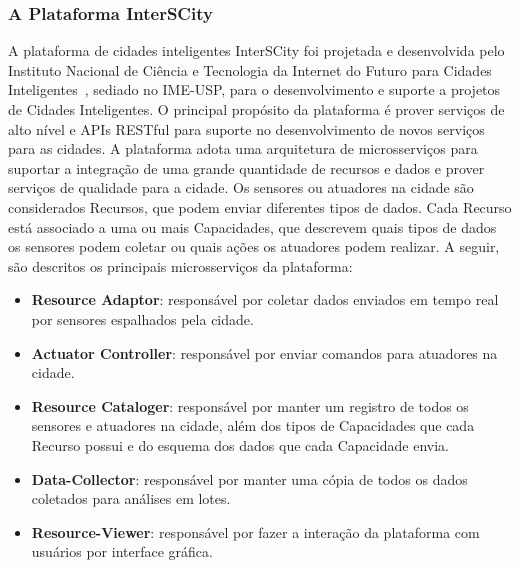 
\subsubsection{A Plataforma InterSCity}
A plataforma de cidades inteligentes InterSCity foi projetada e desenvolvida pelo Instituto Nacional de Ciência e Tecnologia da Internet do Futuro para Cidades Inteligentes~\citep{del2019design}, sediado no IME-USP, para o desenvolvimento e suporte a projetos de Cidades Inteligentes. O principal propósito da plataforma é prover serviços de alto nível e APIs RESTful para suporte no desenvolvimento de novos serviços para as cidades. A plataforma adota uma arquitetura de microsserviços para suportar a integração de uma grande quantidade de recursos e dados e prover serviços de qualidade para a cidade. Os sensores ou atuadores na cidade são considerados Recursos, que podem enviar diferentes tipos de dados. Cada Recurso está associado a uma ou mais Capacidades, que descrevem quais tipos de dados os sensores podem coletar ou quais ações os atuadores podem realizar. A seguir, são descritos os principais microsserviços da plataforma:


\begin{itemize}
\item \textbf{Resource Adaptor}: responsável por coletar dados enviados em tempo real por sensores espalhados pela cidade.
\item \textbf{Actuator Controller}: responsável por enviar comandos para atuadores na cidade.
\item \textbf{Resource Cataloger}: responsável por manter um registro de todos os sensores e atuadores na cidade, além dos tipos de Capacidades que cada Recurso possui e do esquema dos dados que cada Capacidade envia.
\item \textbf{Data-Collector}: responsável por manter uma cópia de todos os dados coletados para análises em lotes.
\item \textbf{Resource-Viewer}: responsável por fazer a interação da plataforma com usuários por interface gráfica.
\end{itemize}

